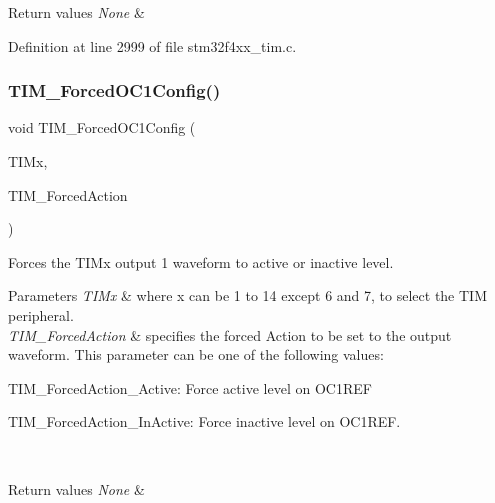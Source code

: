 \begin{DoxyRetVals}{Return values}
{\em None} & \\
\hline
\end{DoxyRetVals}


Definition at line 2999 of file stm32f4xx\+\_\+tim.\+c.

\mbox{\label{group___t_i_m_ga4f58c12e6493a0d8b9555c9097b831d6}} 
\subsubsection{\texorpdfstring{T\+I\+M\+\_\+\+Forced\+O\+C1\+Config()}{TIM\_ForcedOC1Config()}}
{\footnotesize\ttfamily void T\+I\+M\+\_\+\+Forced\+O\+C1\+Config (\begin{DoxyParamCaption}\item[{\hyperlink{struct_t_i_m___type_def}{T\+I\+M\+\_\+\+Type\+Def} $\ast$}]{T\+I\+Mx,  }\item[{uint16\+\_\+t}]{T\+I\+M\+\_\+\+Forced\+Action }\end{DoxyParamCaption})}



Forces the T\+I\+Mx output 1 waveform to active or inactive level. 


\begin{DoxyParams}{Parameters}
{\em T\+I\+Mx} & where x can be 1 to 14 except 6 and 7, to select the T\+IM peripheral. \\
\hline
{\em T\+I\+M\+\_\+\+Forced\+Action} & specifies the forced Action to be set to the output waveform. This parameter can be one of the following values\+: \begin{DoxyItemize}
\item T\+I\+M\+\_\+\+Forced\+Action\+\_\+\+Active\+: Force active level on O\+C1\+R\+EF \item T\+I\+M\+\_\+\+Forced\+Action\+\_\+\+In\+Active\+: Force inactive level on O\+C1\+R\+EF. \end{DoxyItemize}
\\
\hline
\end{DoxyParams}

\begin{DoxyRetVals}{Return values}
{\em None} & \\
\hline
\end{DoxyRetVals}


